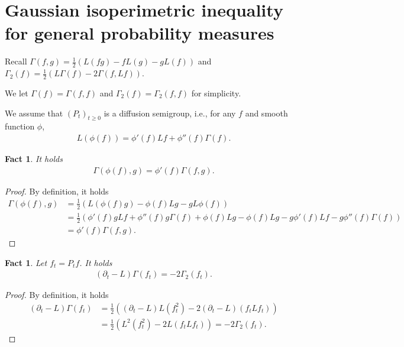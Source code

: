 \documentclass[11pt]{article}
\theoremstyle{plain}
\newtheorem{fact}[theorem]{Fact}
\theoremstyle{definition}
\theoremstyle{remark}
\newcommand{\tuple}[1]{\left(#1\right)}
\newcommand{\tp}{\tuple}
\begin{document}
\section{Gaussian isoperimetric inequality for general probability measures}

Recall $\Gamma(f,g) = \frac{1}{2} \tp{L(fg) - fL(g)-gL(f)}$ and $\Gamma_2(f) = \frac{1}{2}\tp{L\Gamma(f) - 2\Gamma(f,Lf)}$.

We let $\Gamma(f) = \Gamma(f,f)$ and $\Gamma_2(f) = \Gamma_2(f,f)$ for simplicity.

We assume that $(P_t)_{t \ge 0}$ is a diffusion semigroup, i.e., for any $f$ and smooth function $\phi$, 
\begin{align*}
    L(\phi(f)) = \phi'(f) L f + \phi''(f) \Gamma(f).
\end{align*}

\begin{fact}
    It holds
    \begin{align*}
        \Gamma(\phi(f),g) = \phi'(f) \Gamma(f,g).
    \end{align*}
\end{fact}
\begin{proof}
    By definition, it holds
    \begin{align*}
        \Gamma(\phi(f),g) &= \frac{1}{2} \tp{L(\phi(f) g) - \phi(f) L g - g L \phi(f)}\\
        &= \frac{1}{2} \tp{\phi'(f) g L f + \phi''(f) g \Gamma(f) + \phi(f) L g - \phi(f) L g - g \phi'(f) L f - g \phi''(f) \Gamma(f)}\\
        &= \phi'(f) \Gamma(f,g).
    \end{align*}
\end{proof}
\begin{fact}
    Let $f_t = P_t f$. It holds
    \begin{align*}
        (\partial_t - L) \Gamma(f_t) = -2 \Gamma_2(f_t).
    \end{align*}
\end{fact}
\begin{proof}
    By definition, it holds
    \begin{align*}
        (\partial_t - L) \Gamma(f_t) &= \frac{1}{2} \tp{(\partial_t - L) L(f_t^2) - 2 (\partial_t - L)(f_t L f_t)}\\
        &= \frac{1}{2} \tp{L^2 (f_t^2) - 2L(f_t L f_t)} = -2 \Gamma_2(f_t).
    \end{align*}
\end{proof}
\end{document}
